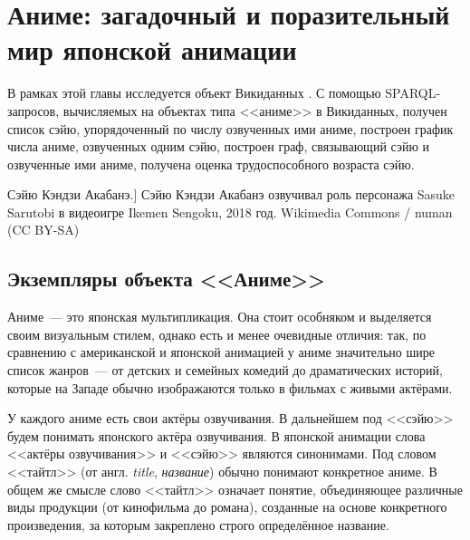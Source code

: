 
\chapter{Аниме: загадочный и поразительный мир японской анимации}
\label{ch:anime}


В рамках этой главы исследуется объект Викиданных . С помощью SPARQL-запросов, вычисляемых на объектах типа <<аниме>> в Викиданных, получен список сэйю, упорядоченный по числу озвученных ими аниме, построен график числа аниме, озвученных одним сэйю, построен граф, связывающий сэйю и озвученные ими аниме, получена оценка трудоспособного возраста сэйю. 

\begin{marginfigure}[0.0cm]
{
	\setlength{\fboxsep}{0pt}%
	\setlength{\fboxrule}{1pt}%
}
\caption
[Сэйю Кэндзи Акабанэ.]
{
Сэйю Кэндзи Акабанэ озвучивал роль персонажа Sasuke Sarutobi в видеоигре Ikemen Sengoku, 2018 год.\newline
Wikimedia Commons / numan (CC BY-SA)
}
\label{fig:seiyu}
\end{marginfigure}

\section{Экземпляры объекта <<Аниме>>}

Аниме~--- это японская мультипликация. Она стоит особняком и выделяется своим визуальным стилем, однако есть и менее очевидные отличия: так, по сравнению с американской и японской анимацией у аниме значительно шире список жанров~--- от детских и семейных комедий до драматических историй, которые на Западе обычно изображаются только в фильмах с живыми актёрами\autocite{anime_vs_animation}.

У каждого аниме есть свои актёры озвучивания. В дальнейшем под <<сэйю>> будем понимать японского актёра озвучивания. В японской анимации слова <<актёры озвучивания>> и <<сэйю>> являются синонимами\autocite{shikimori}. Под словом <<тайтл>> (от англ. \emph{title}, \emph{название}) обычно понимают конкретное аниме\autocite{anime_social}. В общем же смысле слово <<тайтл>> означает понятие, объединяющее различные виды продукции (от кинофильма до романа), созданные на основе конкретного произведения, за которым закреплено строго определённое название\autocite{anime_title_def}.


